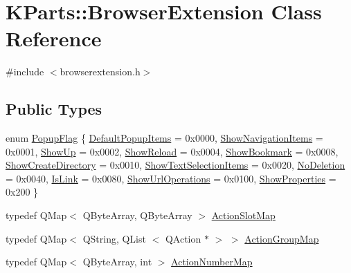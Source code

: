 \hypertarget{classKParts_1_1BrowserExtension}{\section{\-K\-Parts\-:\-:\-Browser\-Extension \-Class \-Reference}
\label{classKParts_1_1BrowserExtension}
}


{\ttfamily \#include $<$browserextension.\-h$>$}

\subsection*{\-Public \-Types}
\begin{DoxyCompactItemize}
\item 
enum \hyperlink{classKParts_1_1BrowserExtension_ae5b9acf92e7d83faf5142597371ef1e3}{\-Popup\-Flag} \{ \*
\hyperlink{classKParts_1_1BrowserExtension_ae5b9acf92e7d83faf5142597371ef1e3a59ee58fca9e8b900d617c4f232b497f7}{\-Default\-Popup\-Items} = 0x0000, 
\hyperlink{classKParts_1_1BrowserExtension_ae5b9acf92e7d83faf5142597371ef1e3a05faf3d46fca9da3a396d72c993eec5c}{\-Show\-Navigation\-Items} = 0x0001, 
\hyperlink{classKParts_1_1BrowserExtension_ae5b9acf92e7d83faf5142597371ef1e3af6030e3884ded53eace393f2af510c68}{\-Show\-Up} = 0x0002, 
\hyperlink{classKParts_1_1BrowserExtension_ae5b9acf92e7d83faf5142597371ef1e3a97cbb12bbef8ef52b233c24d0bf3e41e}{\-Show\-Reload} = 0x0004, 
\*
\hyperlink{classKParts_1_1BrowserExtension_ae5b9acf92e7d83faf5142597371ef1e3ac6c783f725ac9fe594d0b563495feb64}{\-Show\-Bookmark} = 0x0008, 
\hyperlink{classKParts_1_1BrowserExtension_ae5b9acf92e7d83faf5142597371ef1e3a152988520c15f75baddf48de43c9092a}{\-Show\-Create\-Directory} = 0x0010, 
\hyperlink{classKParts_1_1BrowserExtension_ae5b9acf92e7d83faf5142597371ef1e3a947c452c66b8c500ac2ce303451d68c4}{\-Show\-Text\-Selection\-Items} = 0x0020, 
\hyperlink{classKParts_1_1BrowserExtension_ae5b9acf92e7d83faf5142597371ef1e3a2332ecaf86d9179ba1ba92b9b3b10463}{\-No\-Deletion} = 0x0040, 
\*
\hyperlink{classKParts_1_1BrowserExtension_ae5b9acf92e7d83faf5142597371ef1e3a0521ef0fcccfba841ae8c5ae373f8976}{\-Is\-Link} = 0x0080, 
\hyperlink{classKParts_1_1BrowserExtension_ae5b9acf92e7d83faf5142597371ef1e3a40232b7894e5aa48029559354b84aeb5}{\-Show\-Url\-Operations} = 0x0100, 
\hyperlink{classKParts_1_1BrowserExtension_ae5b9acf92e7d83faf5142597371ef1e3a12a41a796fe0be4f8411259b7a77920d}{\-Show\-Properties} = 0x200
 \}
\item 
typedef \-Q\-Map$<$ \-Q\-Byte\-Array, \*
\-Q\-Byte\-Array $>$ \hyperlink{classKParts_1_1BrowserExtension_ac931bbd8189a4386b609180b5e704344}{\-Action\-Slot\-Map}
\item 
typedef \-Q\-Map$<$ \-Q\-String, \-Q\-List\*
$<$ \-Q\-Action $\ast$ $>$ $>$ \hyperlink{classKParts_1_1BrowserExtension_a73ab162c395443c0227946524a8ee04c}{\-Action\-Group\-Map}
\item 
typedef \-Q\-Map$<$ \-Q\-Byte\-Array, int $>$ \hyperlink{classKParts_1_1BrowserExtension_a71369db13dead055035067d4f8ff498d}{\-Action\-Number\-Map}
\end{DoxyCompactItemize}
